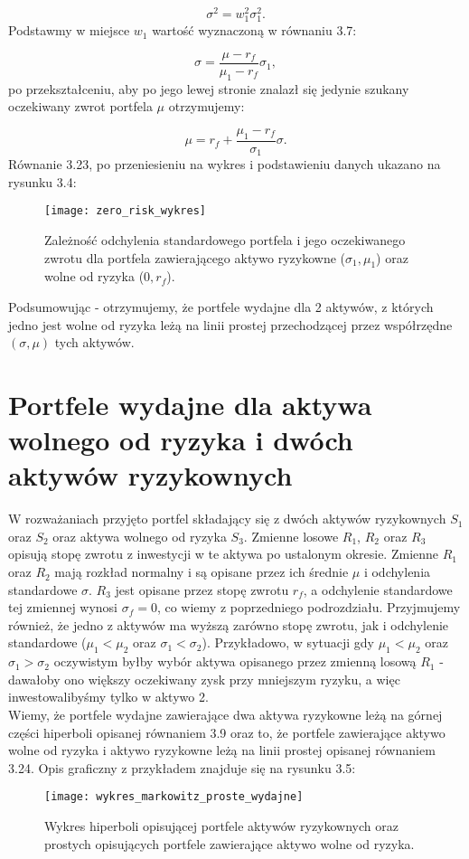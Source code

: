 \documentclass[magister]{dyplom}
\begin{document}
\begin{equation}
\sigma^2 = w_1^{2}\sigma_1^{2}.
\end{equation}
Podstawmy w miejsce $w_1$ wartość wyznaczoną w równaniu 3.7:

\begin{equation}
	\sigma = \frac{\mu - r_f}{\mu_1 - r_f}\sigma_1,
\end{equation}
po przekształceniu, aby po jego lewej stronie znalazł się jedynie szukany oczekiwany zwrot portfela $\mu$ otrzymujemy:

\begin{equation}
	\mu = r_f + \frac{\mu_1 - r_f}{\sigma_1}\sigma.
\end{equation}
Równanie 3.23, po przeniesieniu na wykres i podstawieniu danych ukazano na rysunku 3.4:

\begin{figure}[h!]
	\centering
	\texttt{[image: zero\_risk\_wykres]}
	\caption{Zależność odchylenia standardowego portfela i jego oczekiwanego zwrotu dla portfela zawierającego aktywo ryzykowne ($\sigma_1, \mu_1$) oraz wolne od ryzyka ($0, r_f$).}
\end{figure}
\newpage
Podsumowując - otrzymujemy, że portfele wydajne dla 2 aktywów, z których jedno jest wolne od ryzyka leżą na linii prostej przechodzącej przez współrzędne $(\sigma, \mu)$ tych aktywów.

\section{Portfele wydajne dla aktywa wolnego od ryzyka i dwóch aktywów ryzykownych}
W rozważaniach przyjęto portfel składający się z dwóch aktywów ryzykownych $S_1$ oraz $S_2$ oraz aktywa wolnego od ryzyka $S_3$. Zmienne losowe $R_1$, $R_2$ oraz $R_3$ opisują stopę zwrotu z inwestycji w te aktywa po ustalonym okresie. Zmienne $R_1$ oraz $R_2$ mają rozkład normalny i są opisane przez ich średnie $\mu$ i odchylenia standardowe $\sigma$. $R_3$ jest opisane przez stopę zwrotu $r_f$, a odchylenie standardowe tej zmiennej wynosi $\sigma_f = 0$, co wiemy z poprzedniego podrozdziału. Przyjmujemy również, że jedno z aktywów ma wyższą zarówno stopę zwrotu, jak i odchylenie standardowe ($\mu_1 < \mu_2$ oraz $\sigma_1 < \sigma_2$). Przykładowo, w sytuacji gdy $\mu_1 < \mu_2$ oraz $\sigma_1 > \sigma_2$ oczywistym byłby wybór aktywa opisanego przez zmienną losową $R_1$ - dawałoby ono większy oczekiwany zysk przy mniejszym ryzyku, a więc inwestowalibyśmy tylko w aktywo 2.\\
Wiemy, że portfele wydajne zawierające dwa aktywa ryzykowne leżą na górnej części hiperboli opisanej równaniem 3.9 oraz to, że portfele zawierające aktywo wolne od ryzyka i aktywo ryzykowne leżą na linii prostej opisanej równaniem 3.24. Opis graficzny z przykładem znajduje się na rysunku 3.5:\\ 
\newpage
\begin{figure}[h]
	\centering
	\texttt{[image: wykres\_markowitz\_proste\_wydajne]}
	\caption{Wykres hiperboli opisującej portfele aktywów ryzykownych oraz prostych opisujących portfele zawierające aktywo wolne od ryzyka.}
\end{figure}
\end{document}
